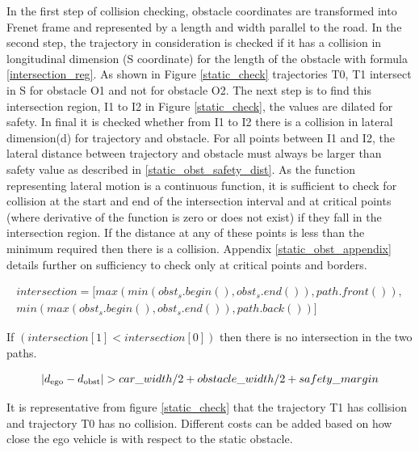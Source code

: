 In the first step of collision checking, obstacle coordinates are transformed into Frenet frame and represented by a length and width parallel to the road. In the second step, the trajectory in consideration is checked if it has a collision in longitudinal dimension (S coordinate) for the length of the obstacle with formula \ref{intersection_reg}. As shown in Figure \ref{static_check} trajectories T0, T1 intersect in S for obstacle O1 and not for obstacle O2. The next step is to find this intersection region, I1 to I2 in Figure \ref{static_check}, the values are dilated for safety. In final it is checked whether from I1 to I2 there is a collision in lateral dimension(d) for trajectory and obstacle. For all points between I1 and I2, the lateral distance between trajectory and obstacle must always be larger than safety value as described in \ref{static_obst_safety_dist}. As the function representing lateral motion is a continuous function, it is sufficient to check for collision at the start and end of the intersection interval and at critical points (where derivative of the function is zero or does not exist) if they fall in the intersection region. If the distance at any of these points is less than the minimum required then there is a collision. Appendix \ref{static_obst_appendix} details further on sufficiency to check only at critical points and borders. 

\begin{equation}\label{intersection_reg}
\begin{aligned}
intersection = [max(min(obst_s.begin(),obst_s.end()),path.front()),\\ min(max(obst_s.begin(),obst_s.end()),path.back())]
\end{aligned}
\end{equation}

If $(intersection[1]<intersection[0])$  then there is no intersection in the two paths. 


\begin{equation}
    |d\textsubscript{ego} - d\textsubscript{obst}| > car\_width/2 + obstacle\_width/2 + safety\_margin
    \label{static_obst_safety_dist}
\end{equation}

It is representative from figure \ref{static_check} that the trajectory T1 has collision and trajectory T0 has no collision. Different costs can be added based on how close the ego vehicle is with respect to the static obstacle.  

